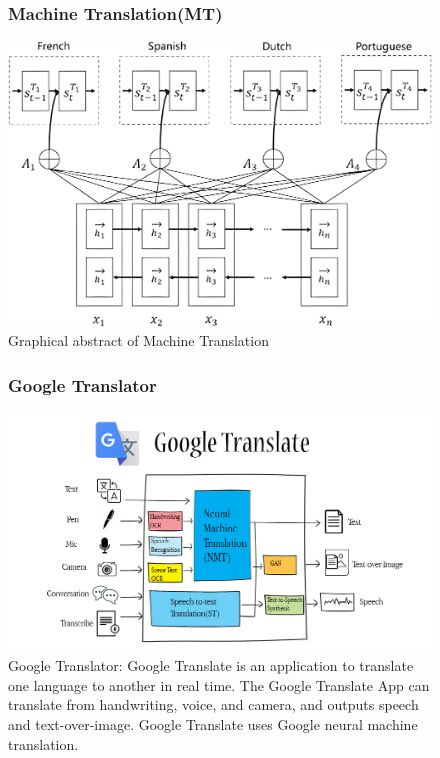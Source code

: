 \documentclass[12px]{beamer}
\begin{document}
\begin{frame}
\begin{figure}
    \frametitle{Machine Translation(MT)}
    \includegraphics[width=\textwidth]{MT.png}
    \caption{Graphical abstract of Machine Translation}
\end{figure}
\end{frame}

\begin{frame}
\begin{figure}
    \frametitle{Google Translator}
    \includegraphics[width=\textwidth]{googletrans.jpeg}
    \caption{Google Translator: Google Translate is an application to translate one language to another in real time. The Google Translate App can translate from handwriting, voice, and camera, and outputs speech and text-over-image. Google Translate uses Google neural machine translation.}
\end{figure}
\end{frame}
\end{document}
